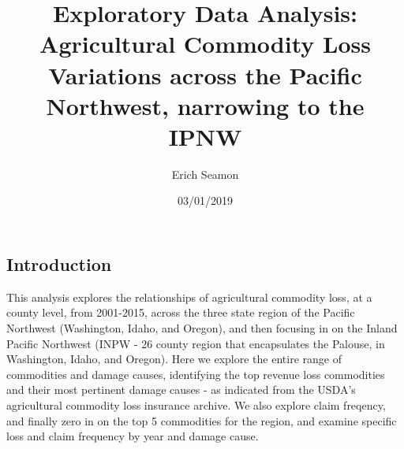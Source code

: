 \documentclass[]{article}
\title{Exploratory Data Analysis: Agricultural Commodity Loss Variations across
the Pacific Northwest, narrowing to the IPNW}
\author{Erich Seamon}
\date{03/01/2019}
\begin{document}
\maketitle

\subsection{Introduction}\label{introduction}

This analysis explores the relationships of agricultural commodity loss,
at a county level, from 2001-2015, across the three state region of the
Pacific Northwest (Washington, Idaho, and Oregon), and then focusing in
on the Inland Pacific Northwest (INPW - 26 county region that
encapsulates the Palouse, in Washington, Idaho, and Oregon). Here we
explore the entire range of commodities and damage causes, identifying
the top revenue loss commodities and their most pertinent damage causes
- as indicated from the USDA's agricultural commodity loss insurance
archive. We also explore claim freqency, and finally zero in on the top
5 commodities for the region, and examine specific loss and claim
frequency by year and damage cause.
\end{document}
